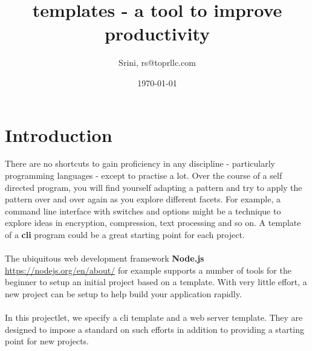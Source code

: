 \documentclass[12pt, a4paper]{article} %
\title{templates - a tool to improve productivity} %
\author{Srini, rs@toprllc.com}
\date{\small \today}
\begin{document}

%

\maketitle %

\setcounter{page}{1} %

\section{Introduction} 

There are no shortcuts to gain proficiency in any discipline - particularly programming languages - except to practise a lot. Over the course of a self directed program, you will find yourself adapting a pattern and try to apply the pattern over and over again as you explore different facets. For example, a command line interface with switches and options might be a technique to explore ideas in encryption, compression, text processing and so on. A template of a \textbf{cli} program could be a great starting point for each project.

\paragraph{}
The ubiquitous web development framework \textbf{Node.js} \url{https://nodejs.org/en/about/} for example  supports a number of tools for the beginner to setup an initial project based on a template. With very little effort, a new project can be setup to help build your application rapidly.

\paragraph{}
In this projectlet, we specify a cli template and a web server template. They are designed to impose a standard on such efforts in addition to providing a starting point for new projects. 
\end{document}
